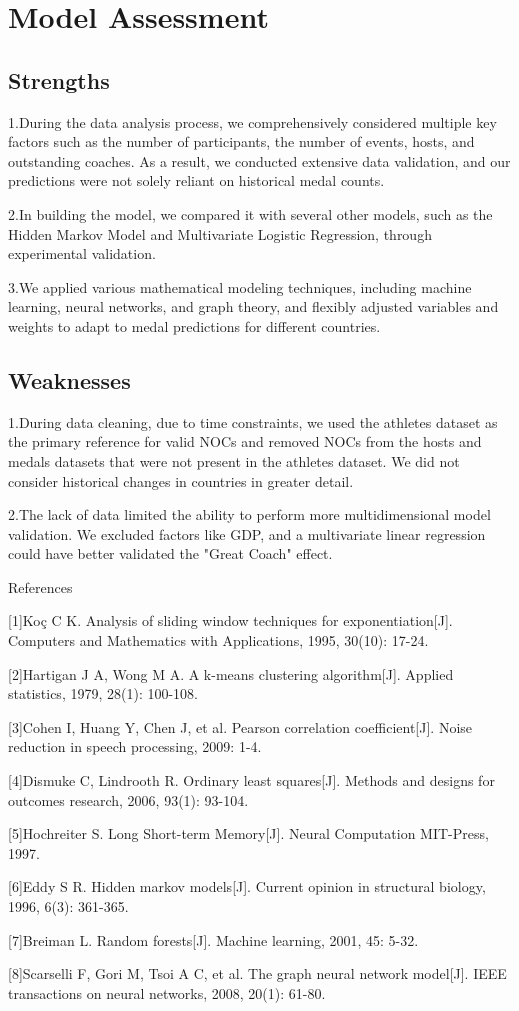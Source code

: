 \documentclass{mcmthesis}
\begin{document}
\section{Model Assessment}
\subsection{Strengths}
1.During the data analysis process, we comprehensively considered multiple key factors such as the number of participants, the number of events, hosts, and outstanding coaches. As a result, we conducted extensive data validation, and our predictions were not solely reliant on historical medal counts.

2.In building the model, we compared it with several other models, such as the Hidden Markov Model and Multivariate Logistic Regression, through experimental validation.

3.We applied various mathematical modeling techniques, including machine learning, neural networks, and graph theory, and flexibly adjusted variables and weights to adapt to medal predictions for different countries.
\subsection{Weaknesses}
1.During data cleaning, due to time constraints, we used the athletes dataset as the primary reference for valid NOCs and removed NOCs from the hosts and medals datasets that were not present in the athletes dataset. We did not consider historical changes in countries in greater detail.

2.The lack of data limited the ability to perform more multidimensional model validation. We excluded factors like GDP, and a multivariate linear regression could have better validated the "Great Coach" effect.
\newpage

{\LARGE References}

[1]Koç C K. Analysis of sliding window techniques for exponentiation[J]. Computers and Mathematics with Applications, 1995, 30(10): 17-24.

[2]Hartigan J A, Wong M A. A k-means clustering algorithm[J]. Applied statistics, 1979, 28(1): 100-108.

[3]Cohen I, Huang Y, Chen J, et al. Pearson correlation coefficient[J]. Noise reduction in speech processing, 2009: 1-4.

[4]Dismuke C, Lindrooth R. Ordinary least squares[J]. Methods and designs for outcomes research, 2006, 93(1): 93-104.

[5]Hochreiter S. Long Short-term Memory[J]. Neural Computation MIT-Press, 1997.

[6]Eddy S R. Hidden markov models[J]. Current opinion in structural biology, 1996, 6(3): 361-365.

[7]Breiman L. Random forests[J]. Machine learning, 2001, 45: 5-32.

[8]Scarselli F, Gori M, Tsoi A C, et al. The graph neural network model[J]. IEEE transactions on neural networks, 2008, 20(1): 61-80.
\end{document}
